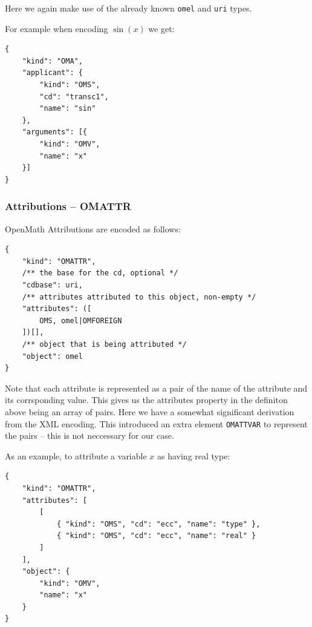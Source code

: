 Here we again make use of the already known \texttt{omel} and \texttt{uri} types. 

For example when encoding $\sin(x)$ we get:
\\\begin{minipage}{\linewidth}\begin{lstlisting}
{
    "kind": "OMA",
    "applicant": {
        "kind": "OMS",
        "cd": "transc1",
        "name": "sin"
    },
    "arguments": [{
        "kind": "OMV",
        "name": "x"
    }]
}
\end{lstlisting}\end{minipage}

\subsubsection{Attributions -- OMATTR}

OpenMath Attributions are encoded as follows:
\\\begin{minipage}{\linewidth}\begin{lstlisting}
{
    "kind": "OMATTR", 
    /** the base for the cd, optional */
    "cdbase": uri, 
    /** attributes attributed to this object, non-empty */
    "attributes": ([
        OMS, omel|OMFOREIGN
    ])[],
    /** object that is being attributed */
    "object": omel
}
\end{lstlisting}\end{minipage}

Note that each attribute is represented as a pair of the name of the attribute and its corrsponding value. 
This gives us the attributes property in the definiton above being an array of pairs. 
Here we have a somewhat significant derivation from the XML encoding. 
This introduced an extra element \texttt{OMATTVAR} to represent the pairs -- this is not neccessary for our case. 

As an example, to attribute a variable $x$ as having real type:
\\\begin{minipage}{\linewidth}\begin{lstlisting}
{
    "kind": "OMATTR",
    "attributes": [
        [
            { "kind": "OMS", "cd": "ecc", "name": "type" },
            { "kind": "OMS", "cd": "ecc", "name": "real" }
        ]
    ],
    "object": {
        "kind": "OMV",
        "name": "x"
    }
}
\end{lstlisting}\end{minipage}

